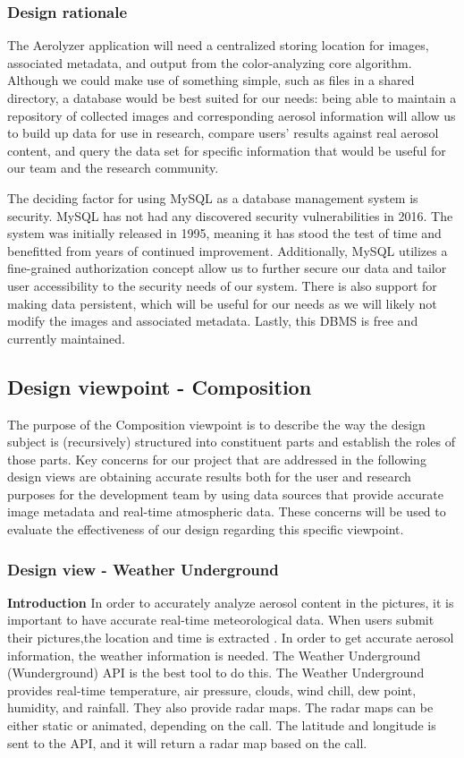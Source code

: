 \documentclass[onecolumn, draftclsnofoot,10pt, compsoc]{IEEEtran}
\begin{document}
\begin{flushleft}
\subsubsection{Design rationale}
The Aerolyzer application will need a centralized storing location for images, associated metadata, and output from the color-analyzing core algorithm. Although we could make use of something simple, such as files in a shared directory, a database would be best suited for our needs: being able to maintain a repository of collected images and corresponding aerosol information will allow us to build up data for use in research, compare users’ results against real aerosol content, and query the data set for specific information that would be useful for our team and the research community. 

\medskip

The deciding factor for using MySQL as a database management system is security. MySQL has not had any discovered security vulnerabilities in 2016. \cite{23} The system was initially released in 1995, meaning it has stood the test of time and benefitted from years of continued improvement. \cite{22} Additionally, MySQL utilizes a fine-grained authorization concept allow us to further secure our data and tailor user accessibility to the security needs of our system. There is also support for making data persistent, which will be useful for our needs as we will likely not modify the images and associated metadata. Lastly, this DBMS is free and currently maintained.

\subsection{Design viewpoint - Composition}
The purpose of the Composition viewpoint is to describe the way the design subject is (recursively) structured into constituent parts and establish the roles of those parts.  Key concerns for our project that are addressed in the following design views are obtaining accurate results both for the user and research purposes for the development team by using data sources that provide accurate image metadata and real-time atmospheric data. These concerns will be used to evaluate the effectiveness of our design regarding this specific viewpoint.

\subsubsection{Design view - Weather Underground}
\textbf{Introduction} In order to accurately analyze aerosol content in the pictures, it is important to have accurate real-time meteorological data. When users submit their pictures,the location and time is extracted . In order to get accurate aerosol information, the weather information is needed. The Weather Underground (Wunderground) API is the best tool to do this. The Weather Underground provides real-time temperature, air pressure, clouds, wind chill, dew point, humidity, and rainfall. They also provide radar maps. The radar maps can be either static or animated, depending on the call. The latitude and longitude is sent to the API, and it will return a radar map based on the call. \cite{3}


\end{flushleft}
\end{document}
